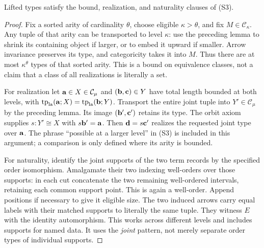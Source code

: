 \begin{lemma}
\label{lem:la-realization}
Lifted types satisfy the bound, realization, and naturality clauses of
(S3).
\end{lemma}
\begin{proof}
Fix a sorted arity of cardinality $\theta$, choose eligible $\kappa>\theta$,
and fix $M\in\mathcal C_\kappa$. Any tuple of that arity can be
transported to level $\kappa$: use the preceding lemma to shrink its
containing object if larger, or to embed it upward if smaller. Arrow
invariance preserves its type, and categoricity takes it into $M$.
Thus there are at most $\kappa^\theta$ types of that sorted arity.
This is a bound on equivalence classes, not a claim that a class of
all realizations is literally a set.

For realization let $\mathbf{a}\in X\in\mathcal C_\mu$ and
$(\mathbf{b},\mathbf{c})\in Y$ have total length bounded at both levels, with
$\operatorname{tp}_{\mathrm{la}}(\mathbf{a};X)=
\operatorname{tp}_{\mathrm{la}}(\mathbf{b};Y)$.
Transport the entire joint tuple into $Y'\in\mathcal C_\mu$ by the
preceding lemma. Its image $(\mathbf{b}',\mathbf{c}')$ retains its type.
The orbit axiom supplies $s:Y'\cong X$ with $s\mathbf{b}'=\mathbf{a}$.
Then $\mathbf{d}=s\mathbf{c}'$ realizes the requested joint type over $\mathbf{a}$.
The phrase ``possible at a larger level'' in (S3) is included in this
argument; a comparison is only defined where its arity is bounded.

For naturality, identify the joint supports of the two term records
by the specified order isomorphism. Amalgamate their two indexing
well-orders over those supports: in each cut concatenate the two
remaining well-ordered intervals, retaining each common support point.
This is again a well-order. Append positions if necessary to give it
eligible size. The two induced arrows carry equal labels with their
matched supports to literally the same tuple. They witness $E$ with
the identity automorphism. This works across different levels and
includes supports for named data. It uses the \emph{joint} pattern,
not merely separate order types of individual supports.
\end{proof}


